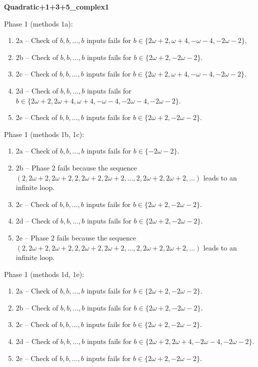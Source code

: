 \begin{exmp}
\label{ex:compareAN}

\textbf{Quadratic+1+3+5\_complex1}

Phase 1 (methods 1a):
\begin{enumerate}[ ]
\item  2a -- Check of $b,b,\dots,b$ inputs fails for $b\in \{2\omega + 2, \omega + 4, -\omega - 4, -2\omega - 2\}$.
\item  2b -- Check of $b,b,\dots,b$ inputs fails for $b\in \{2\omega + 2, -2\omega - 2\}$.
\item  2c -- Check of $b,b,\dots,b$ inputs fails for $b\in \{2\omega + 2, \omega + 4, -\omega - 4, -2\omega - 2\}$.
\item  2d -- Check of $b,b,\dots,b$ inputs fails for $b\in \{2\omega + 2, 2\omega + 4, \omega + 4, -\omega - 4, -2\omega - 4, -2\omega - 2\}$.
\item  2e -- Check of $b,b,\dots,b$ inputs fails for $b\in \{2\omega + 2, -2\omega - 2\}$.
\end{enumerate}


Phase 1 (methods 1b, 1c):
\begin{enumerate}[ ]
\item  2a -- Check of $b,b,\dots,b$ inputs fails for $b\in \{-2\omega - 2\}$.
\item  2b -- Phase 2   fails because  the sequence $(2, 2\omega + 2, 2\omega + 2, 2, 2\omega + 2, 2\omega + 2, \dots ,2, 2\omega + 2, 2\omega + 2, \dots)$ leads to an infinite loop.
\item  2c -- Check of $b,b,\dots,b$ inputs fails for $b\in \{2\omega + 2, -2\omega - 2\}$.
\item  2d -- Check of $b,b,\dots,b$ inputs fails for $b\in \{2\omega + 2, -2\omega - 2\}$.
\item  2e -- Phase 2   fails because  the sequence $(2, 2\omega + 2, 2\omega + 2, 2, 2\omega + 2, 2\omega + 2, \dots ,2, 2\omega + 2, 2\omega + 2, \dots)$ leads to an infinite loop.
\end{enumerate}


Phase 1 (methods 1d, 1e):
\begin{enumerate}[ ]
\item  2a -- Check of $b,b,\dots,b$ inputs fails for $b\in \{2\omega + 2, -2\omega - 2\}$.
\item  2b -- Check of $b,b,\dots,b$ inputs fails for $b\in \{2\omega + 2, -2\omega - 2\}$.
\item  2c -- Check of $b,b,\dots,b$ inputs fails for $b\in \{2\omega + 2, -2\omega - 2\}$.
\item  2d -- Check of $b,b,\dots,b$ inputs fails for $b\in \{2\omega + 2, 2\omega + 4, -2\omega - 4, -2\omega - 2\}$.
\item  2e -- Check of $b,b,\dots,b$ inputs fails for $b\in \{2\omega + 2, -2\omega - 2\}$.
\end{enumerate}


\end{exmp}




